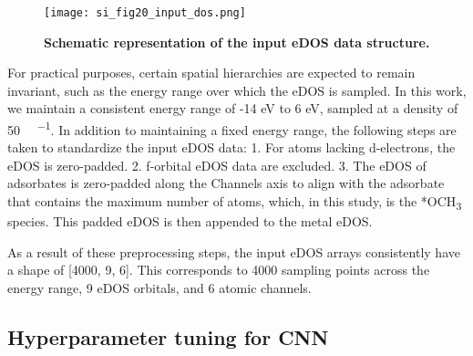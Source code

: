 \begin{figure}[htbp]
  \centering
  \texttt{[image: si\_fig20\_input\_dos.png]}
  \caption{\textbf{Schematic representation of the input eDOS data structure.}}
  \label{si_fig20:input_dos}
\end{figure}

For practical purposes, certain spatial hierarchies are expected to remain invariant,
such as the energy range over which the eDOS is sampled.
In this work, we maintain a consistent energy range of -14 eV to 6 eV,
sampled at a density of 50 \si{ \cdot {}^{-1}}.
In addition to maintaining a fixed energy range,
the following steps are taken to standardize the input eDOS data:
  1.	For atoms lacking d-electrons, the eDOS is zero-padded.
  2.	f-orbital eDOS data are excluded.
  3.	The eDOS of adsorbates is zero-padded along the Channels axis to align with the adsorbate that contains the maximum number of atoms, which, in this study, is the *OCH\textsubscript{3} species. This padded eDOS is then appended to the metal eDOS.

As a result of these preprocessing steps, the input eDOS arrays consistently have a shape of [4000, 9, 6].
This corresponds to 4000 sampling points across the energy range, 9 eDOS orbitals, and 6 atomic channels.

\subsection{Hyperparameter tuning for CNN}
\label{si_sec3.4_hyperparam}

